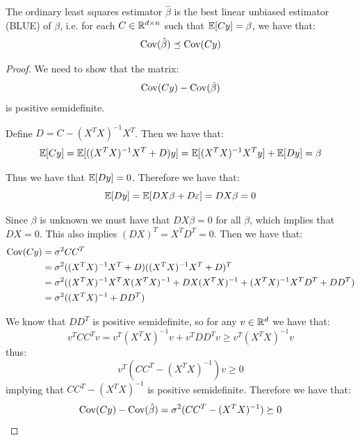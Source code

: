 \begin{theorem} \label{thm:gauss-markov}
    The ordinary least squares estimator $\hat{\beta}$ is the best linear unbiased estimator (BLUE) of $\beta$, i.e. for each $C \in \mathbb{R}^{d \times n}$ such that $\operatorname{\mathbb{E}}[C y] = \beta$, we have that:
    \[\operatorname{Cov}(\hat{\beta}) \preceq \operatorname{Cov}(Cy)\]    
\end{theorem}
\begin{proof}            
    We need to show that the matrix:
    \[\operatorname{Cov}(Cy) - \operatorname{Cov}(\hat{\beta})\]
    is positive semidefinite.
    
    Define $D = C - (X^TX)^{-1}X^T$. Then we have that:
    \[\operatorname{\mathbb{E}} [Cy] 
        = \operatorname{\mathbb{E}} [((X^TX)^{-1}X^T + D)y]
        = \operatorname{\mathbb{E}} [(X^TX)^{-1}X^Ty] + \operatorname{\mathbb{E}}[Dy]
        = \beta\]
    
    Thus we have that $\operatorname{\mathbb{E}}[Dy] = 0$. Therefore we have that:
    \[\operatorname{\mathbb{E}}[Dy] 
        = \operatorname{\mathbb{E}}[DX\beta + D\varepsilon]
        = DX\beta = 0\]
    
    Since $\beta$ is unknown we must have that $DX\beta = 0$ for all $\beta$, which implies that $DX = 0$. This also implies $(DX)^T = X^TD^T = 0$. Then we have that:
    \begin{align*}    
        \operatorname{Cov}(Cy)
        &= \sigma^2 CC^T
        \\ &= \sigma^2 ((X^TX)^{-1}X^T + D)((X^TX)^{-1}X^T + D)^T
        \\ &= \sigma^2 ((X^TX)^{-1}X^TX(X^TX)^{-1} + DX(X^TX)^{-1} + (X^TX)^{-1}X^TD^T + DD^T)
        \\ &= \sigma^2 ((X^TX)^{-1} + DD^T)
    \end{align*}

    We know that $DD^T$ is positive semidefinite, so for any $v \in \mathbb{R}^d$ we have that:
    \[v^T CC^T v = v^T (X^TX)^{-1} v + v^T DD^T v \geq v^T (X^TX)^{-1} v\]
    thus:
    \[v^T (CC^T - (X^TX)^{-1}) v \geq 0\]
    implying that $CC^T - (X^TX)^{-1}$ is positive semidefinite. Therefore we have that:
    \[\operatorname{Cov}(Cy) - \operatorname{Cov}(\hat{\beta}) = \sigma^2 (CC^T - (X^TX)^{-1}) \succeq 0\]
\end{proof}